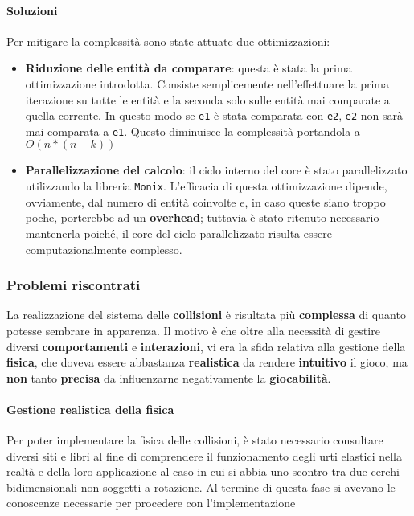  \paragraph{Soluzioni}
Per mitigare la complessità sono state attuate due ottimizzazioni:
\begin{itemize}
    \item \textbf{Riduzione delle entità da comparare}: questa è stata la prima ottimizzazione introdotta. Consiste semplicemente nell'effettuare la prima iterazione su tutte le entità e la seconda solo sulle entità mai comparate a quella corrente. In questo modo se \texttt{e1} è stata comparata con \texttt{e2}, \texttt{e2} non sarà mai comparata a \texttt{e1}. Questo diminuisce la complessità portandola a $O({n}*(n-k))$ 
    \item \textbf{Parallelizzazione del calcolo}: il ciclo interno del core è stato parallelizzato utilizzando la libreria \texttt{Monix}. L'efficacia di questa ottimizzazione dipende, ovviamente, dal numero di entità coinvolte e, in caso queste siano troppo poche, porterebbe ad un \textbf{overhead}; tuttavia è stato ritenuto necessario mantenerla poiché, il core del ciclo parallelizzato risulta essere computazionalmente complesso.
\end{itemize}

\subsubsection{Problemi riscontrati}
La realizzazione del sistema delle \textbf{collisioni} è risultata più \textbf{complessa} di quanto potesse sembrare in apparenza. Il motivo è che oltre alla necessità di gestire diversi \textbf{comportamenti} e \textbf{interazioni}, vi era la sfida relativa alla gestione della \textbf{fisica}, che doveva essere abbastanza \textbf{realistica} da rendere \textbf{intuitivo} il gioco, ma \textbf{non} tanto \textbf{precisa} da influenzarne negativamente la \textbf{giocabilità}.
\paragraph{Gestione realistica della fisica} Per poter implementare la fisica delle collisioni, è stato necessario consultare diversi siti e libri al fine di comprendere il funzionamento degli urti elastici nella realtà e della loro applicazione al caso in cui si abbia uno scontro tra due cerchi bidimensionali non soggetti a rotazione. Al termine di questa fase si avevano le conoscenze necessarie per procedere con l'implementazione 

